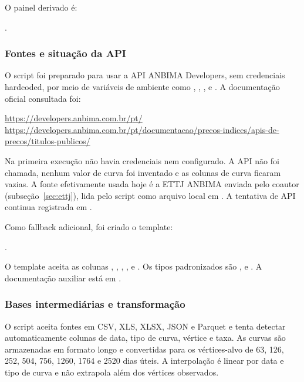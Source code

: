\documentclass[12pt,a4paper]{article}
\begin{document}
O painel derivado é:
\begin{center}
.
\end{center}

\subsubsection{Fontes e situação da API}

O script foi preparado para usar a API ANBIMA Developers, sem credenciais
hardcoded, por meio de variáveis de ambiente como
, ,
,  e
. A documentação oficial consultada foi:
\begin{center}
\url{https://developers.anbima.com.br/pt/}\\
\url{https://developers.anbima.com.br/pt/documentacao/precos-indices/apis-de-precos/titulos-publicos/}
\end{center}

Na primeira execução não havia credenciais nem 
configurado. A API não foi chamada, nenhum valor de curva foi inventado e as
colunas de curva ficaram vazias. A fonte efetivamente usada hoje é a ETTJ ANBIMA
enviada pelo coautor (subseção~\ref{sec:ettj}), lida pelo script como arquivo local
em . A tentativa de API continua registrada em
.

Como fallback adicional, foi criado o template:
\begin{center}
.
\end{center}

O template aceita as colunas , ,
, ,  e .
Os tipos padronizados são ,  e . A documentação
auxiliar está em .

\subsubsection{Bases intermediárias e transformação}

O script aceita fontes em CSV, XLS, XLSX, JSON e Parquet e tenta detectar
automaticamente colunas de data, tipo de curva, vértice e taxa. As curvas são
armazenadas em formato longo e convertidas para os vértices-alvo de 63, 126, 252,
504, 756, 1260, 1764 e 2520 dias úteis. A interpolação é linear por data e tipo de
curva e não extrapola além dos vértices observados.
\end{document}
